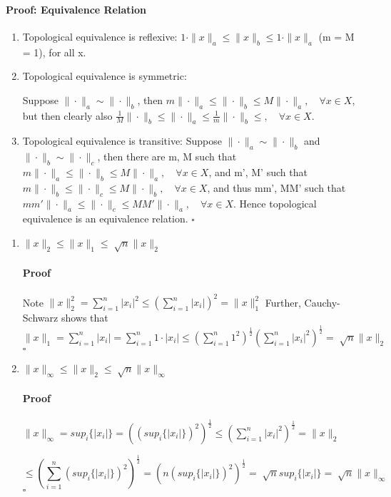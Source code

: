 \documentclass[letterpaper,12pt]{article}
\theoremstyle{definition}
\begin{document}
\paragraph{Proof: Equivalence Relation}
\begin{enumerate}
\item Topological equivalence is reflexive:  $1 \cdot \|x\|_a \le \|x\|_b \le 1 \cdot \|x\|_a$ (m = M = 1), for all x.
\item Topological equivalence is symmetric: 

Suppose  $\|\cdot\|_a \sim \|\cdot\|_b$, then $ m \|\cdot\|_a \le \|\cdot\|_b \le M \|\cdot\|_a, \quad\forall x \in X $, but then clearly also $  \frac{1}{M} \|\cdot\|_b \le \|\cdot\|_a \le \frac{1}{m} \|\cdot\|_b \le, \quad\forall x \in X $.
\item Topological equivalence is transitive: Suppose $\|\cdot\|_a \sim \|\cdot\|_b$ and $\|\cdot\|_b \sim \|\cdot\|_c$, then there are m, M such that $ m \|\cdot\|_a \le \|\cdot\|_b \le M \|\cdot\|_a, \quad\forall x \in X $, and m', M' such that $ m \|\cdot\|_b \le \|\cdot\|_c \le M \|\cdot\|_b, \quad\forall x \in X $, and thus mm', MM' such that $ mm' \|\cdot\|_a \le \|\cdot\|_c \le MM' \|\cdot\|_a, \quad\forall x \in X $. 
Hence topological equivalence is an equivalence relation. $\square$
\end{enumerate}

\begin{enumerate}[label=(\roman*)]

\item $ \| x \|_2 \le \| x \|_1 \le \sqrt[]{n} \| x \|_2 $

\paragraph{Proof} Note $\| x \|_2^2 = \sum_{i = 1}^n |x_i|^2 \le (\sum_{i = 1}^n |x_i|)^2 = \| x \|_1^2 $
Further,  Cauchy-Schwarz shows that  $\| x \|_1 = \sum_{i = 1}^n |x_i| = \sum_{i = 1}^n 1\cdot|x_i| \le (\sum_{i = 1}^n 1^2)^{\frac{1}{2}}(\sum_{i = 1}^n |x_i|^2)^{\frac{1}{2}} = \sqrt[]{n} \| x \|_2 $
$\square$

\item $\| x \|_{\infty} \le \| x \|_2 \le \sqrt[]{n} \| x \|_{\infty}$

\paragraph{Proof} $\| x \|_{\infty} = sup_i\{|x_i|\} = ( (sup_i\{|x_i|\})^2)^{\frac{1}{2}} \le (\sum_{i = 1}^n |x_i|^2)^{\frac{1}{2}}= \| x \|_2 $

$$\le (\sum_{i = 1}^n (sup_i\{|x_i|\})^2)^{\frac{1}{2}} = (n (sup_i\{|x_i|\})^2)^{\frac{1}{2}} = \sqrt[]{n} sup_i\{|x_i|\} = \sqrt[]{n} \| x \|_{\infty}$$
$\square$
\end{enumerate}
\end{document}
